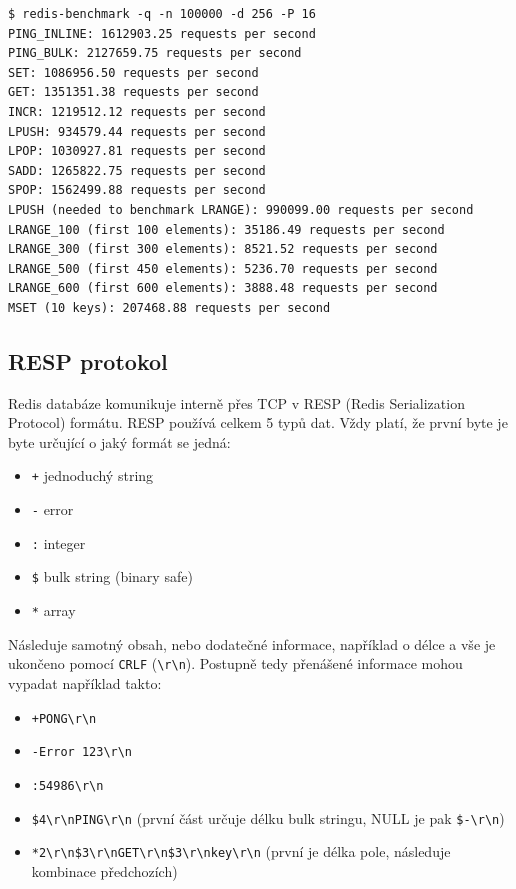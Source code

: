 \begin{verbatim}
$ redis-benchmark -q -n 100000 -d 256 -P 16
PING_INLINE: 1612903.25 requests per second
PING_BULK: 2127659.75 requests per second
SET: 1086956.50 requests per second
GET: 1351351.38 requests per second
INCR: 1219512.12 requests per second
LPUSH: 934579.44 requests per second
LPOP: 1030927.81 requests per second
SADD: 1265822.75 requests per second
SPOP: 1562499.88 requests per second
LPUSH (needed to benchmark LRANGE): 990099.00 requests per second
LRANGE_100 (first 100 elements): 35186.49 requests per second
LRANGE_300 (first 300 elements): 8521.52 requests per second
LRANGE_500 (first 450 elements): 5236.70 requests per second
LRANGE_600 (first 600 elements): 3888.48 requests per second
MSET (10 keys): 207468.88 requests per second
\end{verbatim}

\subsection{RESP protokol}
Redis databáze komunikuje interně přes TCP v RESP (Redis Serialization Protocol) formátu. RESP používá celkem 5 typů dat. Vždy platí, že první byte je byte určující o jaký formát se jedná:

\begin{itemize}
\itemsep0em
\item \texttt{+} jednoduchý string
\item \texttt{-} error
\item \texttt{:} integer
\item \texttt{\$} bulk string (binary safe)
\item \texttt{*} array
\end{itemize}

Následuje samotný obsah, nebo dodatečné informace, například o délce a vše je ukončeno pomocí \texttt{CRLF} (\texttt{\textbackslash r\textbackslash n}). Postupně tedy přenášené informace mohou vypadat například takto:

\begin{itemize}
\itemsep0em
\item \texttt{+PONG\textbackslash r\textbackslash n}
\item \texttt{-Error 123\textbackslash r\textbackslash n}
\item \texttt{:54986\textbackslash r\textbackslash n}
\item \texttt{\$4\textbackslash r\textbackslash nPING\textbackslash r\textbackslash n} (první část určuje délku bulk stringu, NULL je pak \texttt{\$-\textbackslash r\textbackslash n})
\item \texttt{*2\textbackslash r\textbackslash n\$3\textbackslash r\textbackslash nGET\textbackslash r\textbackslash n\$3\textbackslash r\textbackslash nkey\textbackslash r\textbackslash n} (první je délka pole, následuje kombinace předchozích)
\end{itemize}

